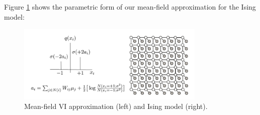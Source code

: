 Figure \ref{fig:ising_vi1} shows the parametric form of our mean-field approximation for the Ising model:
\begin{figure}[hptb]
    \centering
    \includegraphics[width=0.8\textwidth, trim={10 10 10 10}]{figures/ising_vi1.png}
    \caption{Mean-field VI approximation (left) and Ising model (right).}
    \label{fig:ising_vi1}
\end{figure}

